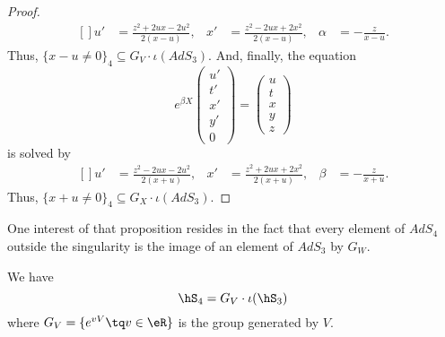 \begin{proof}
\begin{equation}
			\begin{aligned}[]
				u' & =\frac{ z^2+2ux-2u^2 }{ 2(x-u) }, & x' & =\frac{ z^2-2ux+2x^2 }{ 2(x-u) }, & \alpha & =-\frac{ z }{ x-u }.
			\end{aligned}
		\end{equation}
		Thus, $\{ x-u\neq 0 \}_4\subseteq G_V\cdot\iota(AdS_3)$. And, finally, the equation
		\begin{equation}
			e^{\beta X}\begin{pmatrix}
				u' \\
				t' \\
				x' \\
				y' \\
				0
			\end{pmatrix}=
			\begin{pmatrix}
				u \\
				t \\
				x \\
				y \\
				z
			\end{pmatrix}
		\end{equation}
		is solved by
		\begin{equation}
			\begin{aligned}[]
				u' & =\frac{ z^2-2ux-2u^2 }{ 2(x+u) }, & x' & =\frac{ z^2+2ux+2x^2 }{ 2(x+u) }, & \beta & =-\frac{ z }{ x+u }.
			\end{aligned}
		\end{equation}
		Thus, $\{ x+u\neq 0 \}_4\subseteq G_X\cdot\iota(AdS_3)$.

	\end{proof}

	One interest of that proposition resides in the fact that every element of $AdS_4$ outside the singularity is the image of an element of $AdS_3$ by $G_W$.


	\begin{proposition}		\label{PropSingQTiV}
		We have
		\begin{equation}
			\hS_4=G_V\cdot\iota(\hS_3)
		\end{equation}
		where $G_V=\{  e^{vV}\tq v\in\eR \}$ is the group generated by $V$.
	\end{proposition}

